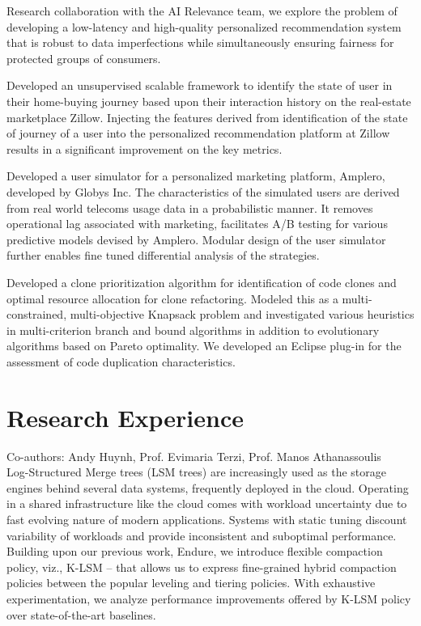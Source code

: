 \documentclass[10pt]{moderncv}
\begin{document}
{
    Research collaboration with the AI Relevance team, we explore the problem of developing a low-latency and
        high-quality personalized recommendation system that is robust to data imperfections while simultaneously 
        ensuring fairness for protected groups of consumers.
}

{
    Developed an unsupervised scalable framework to identify the state of user in their home-buying journey based upon 
        their interaction history on the real-estate marketplace Zillow. 
    Injecting the features derived from identification of the state of journey of a user into the personalized 
        recommendation platform at Zillow results in a significant improvement on the key metrics.
}

{
    Developed a user simulator for a personalized marketing platform, Amplero, developed by Globys Inc. 
    The characteristics of the simulated users are derived from real world telecoms usage data in a probabilistic 
        manner. 
    It removes operational lag associated with marketing, facilitates A/B testing for various predictive models 
        devised by Amplero. 
    Modular design of the user simulator further enables fine tuned differential analysis of the strategies.
}

{
    Developed a clone prioritization algorithm for identification of code clones and optimal resource allocation for 
        clone refactoring. 
    Modeled this as a multi-constrained, multi-objective Knapsack problem and investigated various heuristics in 
        multi-criterion branch and bound algorithms in addition to evolutionary algorithms based on Pareto optimality. 
    We developed an Eclipse plug-in for the assessment of code duplication characteristics.
}

\section{Research Experience}
{
    Co-authors: Andy Huynh, Prof. Evimaria Terzi, Prof. Manos Athanassoulis\\
    Log-Structured Merge trees (LSM trees) are increasingly used as the storage engines behind several data systems,
        frequently deployed in the cloud. 
    Operating in a shared infrastructure like the cloud comes with workload uncertainty due to fast evolving nature of 
        modern applications. 
    Systems with static tuning discount variability of workloads and provide inconsistent and suboptimal performance. 
    Building upon our previous work, Endure, we introduce flexible compaction policy, viz., K-LSM -- that allows us to 
        express fine-grained hybrid compaction policies between the popular leveling and tiering policies. 
    With exhaustive experimentation, we analyze performance improvements offered by K-LSM policy over state-of-the-art 
        baselines.
}
\end{document}
